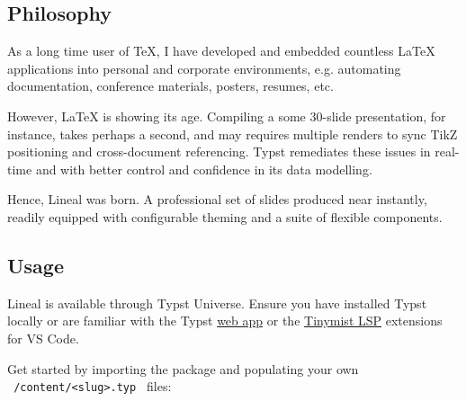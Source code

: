 \subsection{Philosophy}\label{philosophy}

As a long time user of TeX, I have developed and embedded countless
LaTeX applications into personal and corporate environments, e.g.
automating documentation, conference materials, posters, resumes, etc.

However, LaTeX is showing its age. Compiling a some 30-slide
presentation, for instance, takes perhaps a second, and may requires
multiple renders to sync TikZ positioning and cross-document
referencing. Typst remediates these issues in real-time and with better
control and confidence in its data modelling.

Hence, Lineal was born. A professional set of slides produced near
instantly, readily equipped with configurable theming and a suite of
flexible components.

\subsection{Usage}\label{usage}

Lineal is available through Typst Universe. Ensure you have installed
Typst locally or are familiar with the Typst
\href{https://typst.app/}{web app} or the
\href{https://marketplace.visualstudio.com/items?itemName=myriad-dreamin.tinymist}{Tinymist
LSP} extensions for VS Code.

Get started by importing the package and populating your own
\texttt{\ /content/\textless{}slug\textgreater{}.typ\ } files:

\begin{Shaded}
\begin{Highlighting}[]

\NormalTok{  ),}
\NormalTok{)}


\end{Highlighting}
\end{Shaded}

